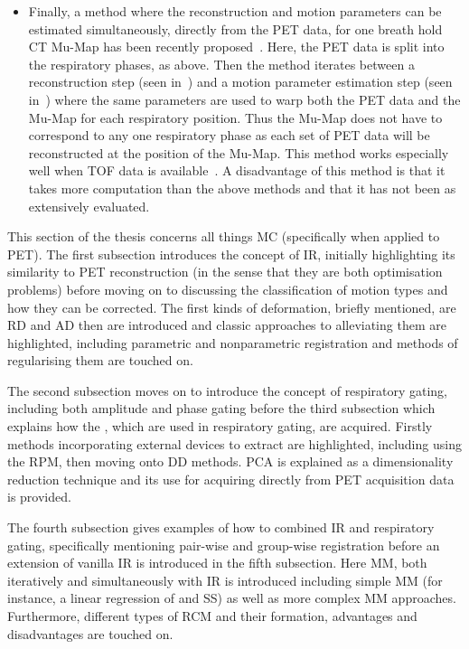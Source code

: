 \begin{itemize}
                \item Finally, a method where the reconstruction and motion parameters can be estimated simultaneously, directly from the \gls{PET} data, for one breath hold \gls{CT} \gls{Mu-Map} has been recently proposed~\parencite{JacobsonFesslerMotionCorrectionBib, Rezaei2018, Bousse2016a}. Here, the \gls{PET} data is split into the respiratory phases, as above. Then the method iterates between a reconstruction step (seen in~) and a motion parameter estimation step (seen in~) where the same parameters are used to warp both the \gls{PET} data and the \gls{Mu-Map} for each respiratory position. Thus the \gls{Mu-Map} does not have to correspond to any one respiratory phase as each set of \gls{PET} data will be reconstructed at the position of the \gls{Mu-Map}. This method works especially well when \gls{TOF} data is available~\parencite{Bousse2016}. A disadvantage of this method is that it takes more computation than the above methods and that it has not been as extensively evaluated.
            \end{itemize}
    
        This section of the thesis concerns all things \gls{MC} (specifically when applied to \gls{PET}). The first subsection introduces the concept of \gls{IR}, initially highlighting its similarity to \gls{PET} reconstruction (in the sense that they are both optimisation problems) before moving on to discussing the classification of motion types and how they can be corrected. The first kinds of deformation, briefly mentioned, are \gls{RD} and \gls{AD} then  are introduced and classic approaches to alleviating them are highlighted, including parametric and nonparametric registration and methods of regularising them are touched on.
        
        The second subsection moves on to introduce the concept of respiratory gating, including both amplitude and phase gating before the third subsection which explains how the , which are used in respiratory gating, are acquired. Firstly methods incorporating external devices to extract  are highlighted, including using the \gls{RPM}, then moving onto \gls{DD} methods. \gls{PCA} is explained as a dimensionality reduction technique and its use for acquiring  directly from \gls{PET} acquisition data is provided.
        
        The fourth subsection gives examples of how to combined \gls{IR} and respiratory gating, specifically mentioning pair-wise and group-wise registration before an extension of vanilla \gls{IR} is introduced in the fifth subsection. Here \gls{MM}, both iteratively and simultaneously with \gls{IR} is introduced including simple \gls{MM} (for instance, a linear regression of  and \gls{SS}) as well as more complex \gls{MM} approaches. Furthermore, different types of \gls{RCM} and their formation, advantages and disadvantages are touched on.
        
